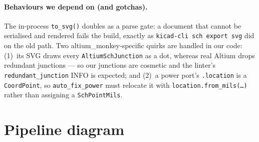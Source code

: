 \documentclass[11pt]{article}
\newcommand{\mod}[1]{\texttt{#1}}
\begin{document}
\paragraph{Behaviours we depend on (and gotchas).} The in-process
\texttt{to\_svg()} doubles as a parse gate: a document that cannot be serialised
and rendered fails the build, exactly as \texttt{kicad-cli sch export svg} did on
the old path. Two altium\_monkey-specific quirks are handled in our code: (1)~its
SVG draws every \mod{AltiumSchJunction} as a dot, whereas real Altium drops
redundant junctions --- so our junctions are cosmetic and the linter's
\texttt{redundant\_junction} INFO is expected; and (2)~a power port's
\texttt{.location} is a \mod{CoordPoint}, so \mod{auto\_fix\_power} must relocate
it with \texttt{location.from\_mils(\dots)} rather than assigning a
\mod{SchPointMils}.

\section{Pipeline diagram}
\end{document}
